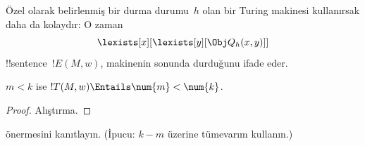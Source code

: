 Özel olarak belirlenmiş bir durma durumu~$h$ olan bir Turing makinesi
kullanırsak daha da kolaydır: O zaman
\[
\lexists[x][\lexists[y][\Obj Q_h(x, y)]]
\]
!!{sentence}~$!E(M,w)$, makinenin sonunda durduğunu ifade eder.

\begin{prop}
$m < k$ ise $!T(M, w) \Entails \num{m} < \num{k}$.
\end{prop}

\begin{proof}
Alıştırma.
\end{proof}

\begin{prob}
 önermesini kanıtlayın.
(İpucu: $k-m$ üzerine tümevarım kullanın.)
\end{prob}

